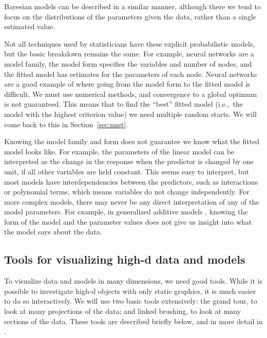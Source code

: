 \documentclass[preprint]{imsart}
\begin{document}
Bayesian models can be described in a similar manner, although there we tend to focus on the distributions of the parameters given the data, rather than a single estimated value.

Not all techniques used by statisticians have these explicit probabilistic models, but the basic breakdown remains the same.  For example, neural networks are a model family, the model form specifies the variables and number of nodes, and the fitted model has estimates for the parameters of each node.  Neural networks are a good example of where going from the model form to the fitted model is difficult.  We must use numerical methods, and convergence to a global optimum is not guaranteed.  This means that to find the ``best'' fitted model (i.e.,\ the model with the highest criterion value) we need multiple random starts.  We will come back to this in Section~\ref{sec:nnet}.

Knowing the model family and form does not guarantee we know what the fitted model looks like.  For example, the parameters of the linear model can be interpreted as the change in the response when the predictor is changed by one unit, if all other variables are held constant.  This seems easy to interpret, but most models have interdependencies between the predictors, such as interactions or polynomial terms,  which means variables do not change independently.  For more complex models, there may never be any direct interpretation of any of the model parameters.  For example, in generalized additive models \citep{wood:2006}, knowing the form of the model and the parameter values does not give us insight into what the model says about the data.

\subsection{Tools for visualizing high-d data and models}

To visualize data and models in many dimensions, we need good tools. While it is possible to investigate high-d objects with only static graphics, it is much easier to do so interactively. We will use two basic tools extensively: the grand tour, to look at many projections of the data; and linked brushing, to look at many sections of the data. These tools are described briefly below, and in more detail in \citet{cook:2007}. %
\end{document}
